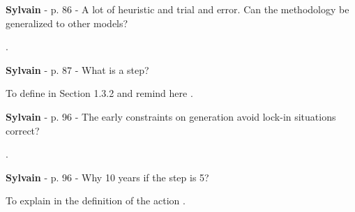 \documentclass[12pt,a4paper]{article}
\begin{document}
\noindent 

\begin{mdframed}[style=manuscript] %

\end{mdframed}

\begin{mdframed}[style=comment] %
{\color{purple} \textbf{Sylvain}} - p. 86 - A lot of heuristic and trial and error. Can the methodology be generalized to other models?
\end{mdframed}

\noindent {\color{blue} }. 

\begin{mdframed}[style=manuscript] %

\end{mdframed}

\begin{mdframed}[style=comment] %
{\color{purple} \textbf{Sylvain}} - p. 87 - What is a step?
\end{mdframed}

\noindent To define in Section 1.3.2 and remind here {\color{blue} }. 

\begin{mdframed}[style=manuscript] %

\end{mdframed}

\begin{mdframed}[style=comment] %
{\color{purple} \textbf{Sylvain}} - p. 96 - The early constraints on generation avoid lock-in situations correct?
\end{mdframed}

\noindent {\color{blue} }. 

\begin{mdframed}[style=manuscript] %

\end{mdframed}

\begin{mdframed}[style=comment] %
{\color{purple} \textbf{Sylvain}} - p. 96 - Why 10 years if the step is 5?
\end{mdframed}

\noindent To explain in the definition of the action {\color{blue} }. 

\begin{mdframed}[style=manuscript] %

\end{mdframed}
\end{document}
